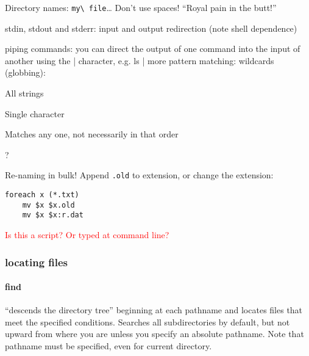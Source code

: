 \documentclass{article}
\begin{document}
Directory names: \verb|my\ file|\ldots
Don't use spaces! ``Royal pain in the butt!''

stdin, stdout and stderr: input and output redirection (note shell
dependence)

piping commands: you can direct the output of one command into the
input of another using the | character, e.g. ls | more
pattern matching: wildcards (globbing):
\begin{description}[labelwidth=1in]
    \item [*] All strings
    \item [?] Single character
    \item [{[abc]}] Matches any one, not necessarily in that order
    \item [regular expressions] ?
\end{description}
Re-naming in bulk! Append \verb|.old| to extension, or change the extension:
\begin{verbatim}
foreach x (*.txt)
    mv $x $x.old
    mv $x $x:r.dat
\end{verbatim}
\textcolor{red}{Is this a script? Or typed at command line?}

\subsubsection{locating files}
\paragraph{\ttfamily find}
``descends the directory tree'' beginning at each
pathname and locates files that meet the
specified conditions. Searches all subdirectories by default,
but not upward from where you are unless you specify an absolute pathname.
Note that pathname must be specified, even for current directory.
\end{document}
